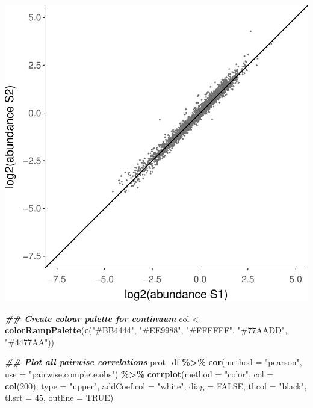 \documentclass[9pt,a4paper,]{extarticle}
\newenvironment{Shaded}{\begin{snugshade}}{\end{snugshade}}
\newcommand{\AttributeTok}[1]{\textcolor[rgb]{0.13,0.29,0.53}{#1}}
\newcommand{\ConstantTok}[1]{\textcolor[rgb]{0.56,0.35,0.01}{#1}}
\newcommand{\DecValTok}[1]{\textcolor[rgb]{0.00,0.00,0.81}{#1}}
\newcommand{\DocumentationTok}[1]{\textcolor[rgb]{0.56,0.35,0.01}{\textbf{\textit{#1}}}}
\newcommand{\FunctionTok}[1]{\textcolor[rgb]{0.13,0.29,0.53}{\textbf{#1}}}
\newcommand{\NormalTok}[1]{#1}
\newcommand{\OtherTok}[1]{\textcolor[rgb]{0.56,0.35,0.01}{#1}}
\newcommand{\SpecialCharTok}[1]{\textcolor[rgb]{0.81,0.36,0.00}{\textbf{#1}}}
\newcommand{\StringTok}[1]{\textcolor[rgb]{0.31,0.60,0.02}{#1}}
\begin{document}
\begin{center}\includegraphics[height=0.3\textheight]{workflow_expressions_files/figure-latex/correlation_plot_2-1} \end{center}

\begin{Shaded}
\begin{Highlighting}[]
\DocumentationTok{\#\# Create colour palette for continuum}
\NormalTok{col }\OtherTok{\textless{}{-}} \FunctionTok{colorRampPalette}\NormalTok{(}\FunctionTok{c}\NormalTok{(}\StringTok{"\#BB4444"}\NormalTok{, }\StringTok{"\#EE9988"}\NormalTok{, }\StringTok{"\#FFFFFF"}\NormalTok{,}
                          \StringTok{"\#77AADD"}\NormalTok{, }\StringTok{"\#4477AA"}\NormalTok{))}

\DocumentationTok{\#\# Plot all pairwise correlations}
\NormalTok{prot\_df }\SpecialCharTok{\%\textgreater{}\%}
  \FunctionTok{cor}\NormalTok{(}\AttributeTok{method =} \StringTok{"pearson"}\NormalTok{, }
      \AttributeTok{use =} \StringTok{"pairwise.complete.obs"}\NormalTok{) }\SpecialCharTok{\%\textgreater{}\%}
  \FunctionTok{corrplot}\NormalTok{(}\AttributeTok{method =} \StringTok{"color"}\NormalTok{,}
           \AttributeTok{col =} \FunctionTok{col}\NormalTok{(}\DecValTok{200}\NormalTok{), }
           \AttributeTok{type =} \StringTok{"upper"}\NormalTok{, }
           \AttributeTok{addCoef.col =} \StringTok{"white"}\NormalTok{,}
           \AttributeTok{diag =} \ConstantTok{FALSE}\NormalTok{, }
           \AttributeTok{tl.col =} \StringTok{"black"}\NormalTok{, }
           \AttributeTok{tl.srt =} \DecValTok{45}\NormalTok{, }
           \AttributeTok{outline =} \ConstantTok{TRUE}\NormalTok{)}
\end{Highlighting}
\end{Shaded}
\end{document}
